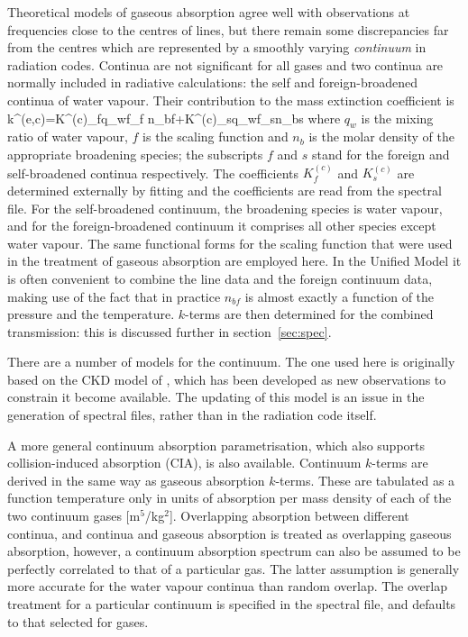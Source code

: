 Theoretical models of gaseous absorption agree well with observations
at frequencies close to the centres of lines, but there remain some
discrepancies far from the centres which are represented by a smoothly 
varying {\em continuum} in radiation codes. Continua are not significant
for all gases and 
two continua are normally included in radiative calculations: the self 
and  foreign-broadened 
continua of water vapour. Their contribution to the mass extinction 
coefficient is
\beq
k^{(e,c)}=K^{(c)}_{f}q_{w}f_{f} n_{bf}+K^{(c)}_{s}q_{w}f_{s}n_{bs}
\label{p2_eq31}
\eeq 
where $q_{w}$ is the mixing ratio of water vapour, $f$ is the scaling 
function and $n_{b}$ is 
the molar density of the appropriate broadening species; the subscripts 
$f$  and $s$  stand for 
the foreign and self-broadened continua respectively. The coefficients 
$K^{(c)}_{f}$ and $K^{(c)}_{s}$  
are determined externally by fitting and the coefficients are read from 
the spectral file. For the 
self-broadened continuum, the broadening species is water vapour, and 
for the foreign-broadened continuum 
it comprises all other species except water vapour. The same functional 
forms for the scaling function that were 
used in the treatment of gaseous absorption are employed here. In the 
Unified Model it is often 
convenient to combine the line data and the foreign continuum data, 
making use of the fact that in practice
$n_{bf}$  is almost exactly a function of the pressure and the 
temperature. $k$-terms are then determined for the combined transmission:
this is discussed further in section~\ref{sec:spec}.

There are a number of models for the continuum. The one used here is
originally based on the CKD model of \cite{Clough89}, which has been
developed as new observations to constrain it become available. The
updating of this model is an issue in the generation of spectral files,
rather than in the radiation code itself.

A more general continuum absorption parametrisation, which also
supports collision-induced absorption (CIA), is also available. Continuum
$k$-terms are derived in the same way as gaseous absorption $k$-terms. These
are tabulated as a function temperature only in units of absorption per mass
density of each of the two continuum gases [m$^5$/kg$^2$]. Overlapping
absorption between different continua, and continua and gaseous absorption is
treated as overlapping gaseous absorption, however, a continuum absorption
spectrum can also be assumed to be perfectly correlated to that of a
particular gas. The latter assumption is generally more accurate for the
water vapour continua than random overlap. The overlap treatment for a
particular continuum is specified in the spectral file, and defaults to
that selected for gases.

